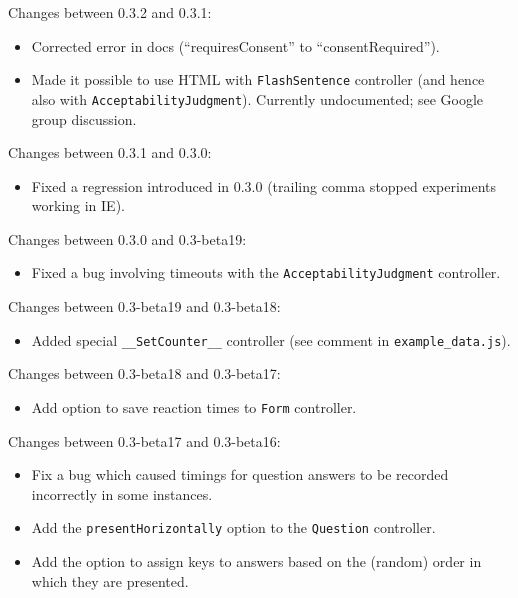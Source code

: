 \documentclass[]{article}
\begin{document}
Changes between 0.3.2 and 0.3.1:

\begin{itemize}
\itemsep1pt\parskip0pt
\item
  Corrected error in docs (``requiresConsent'' to ``consentRequired'').
\item
  Made it possible to use HTML with \texttt{FlashSentence} controller
  (and hence also with \texttt{AcceptabilityJudgment}). Currently
  undocumented; see Google group discussion.
\end{itemize}

Changes between 0.3.1 and 0.3.0:

\begin{itemize}
\itemsep1pt\parskip0pt
\item
  Fixed a regression introduced in 0.3.0 (trailing comma stopped
  experiments working in IE).
\end{itemize}

Changes between 0.3.0 and 0.3-beta19:

\begin{itemize}
\itemsep1pt\parskip0pt
\item
  Fixed a bug involving timeouts with the \texttt{AcceptabilityJudgment}
  controller.
\end{itemize}

Changes between 0.3-beta19 and 0.3-beta18:

\begin{itemize}
\itemsep1pt\parskip0pt
\item
  Added special \texttt{\_\_SetCounter\_\_} controller (see comment in
  \texttt{example\_data.js}).
\end{itemize}

Changes between 0.3-beta18 and 0.3-beta17:

\begin{itemize}
\itemsep1pt\parskip0pt
\item
  Add option to save reaction times to \texttt{Form} controller.
\end{itemize}

Changes between 0.3-beta17 and 0.3-beta16:

\begin{itemize}
\itemsep1pt\parskip0pt
\item
  Fix a bug which caused timings for question answers to be recorded
  incorrectly in some instances.
\item
  Add the \texttt{presentHorizontally} option to the \texttt{Question}
  controller.
\item
  Add the option to assign keys to answers based on the (random) order
  in which they are presented.
\end{itemize}
\end{document}
